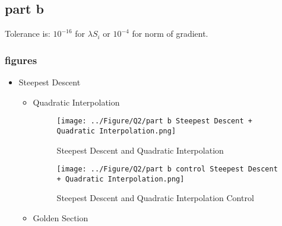 \subsection{part b}
Tolerance is: $10^{-16}$ for $\lambda  S_i$ or $10^{-4}$ for norm of gradient.
\subsubsection{figures}
\newpage
\begin{itemize}
	\item Steepest Descent
	\begin{itemize}
		\item Quadratic Interpolation
		\begin{figure}[H]
			\caption{Steepest Descent and Quadratic Interpolation}
			\centering
			\texttt{[image: ../Figure/Q2/part b Steepest Descent + Quadratic Interpolation.png]}
		\end{figure}
		\begin{figure}[H]
			\caption{Steepest Descent and Quadratic Interpolation Control}
			\centering
			\texttt{[image: ../Figure/Q2/part b control Steepest Descent + Quadratic Interpolation.png]}
		\end{figure}
	\newpage
		\item Golden Section
		

\end{itemize}
\end{itemize}
